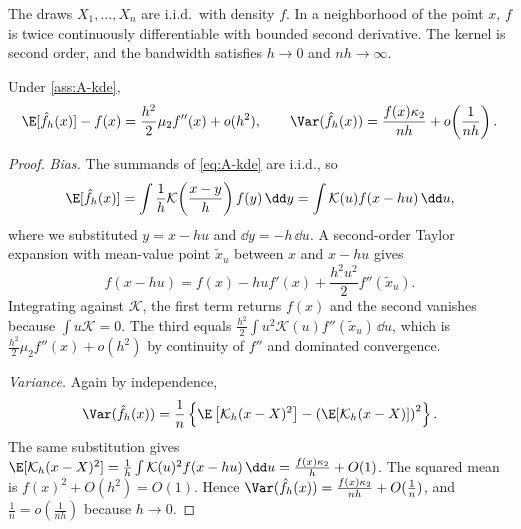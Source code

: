 \begin{assumption}\label{ass:A-kde}
The draws $X_1,\dots,X_n$ are i.i.d.\ with density $f$. In a neighborhood of the point $x$, $f$ is twice
continuously differentiable with bounded second derivative. The kernel is second order, and the bandwidth
satisfies $h\to0$ and $nh\to\infty$.
\end{assumption}

\begin{proposition}\label{prop:A-kde-bias-var}
Under \cref{ass:A-kde},
\begin{equation}\label{eq:A-kde-bias-var}
\E[\hat f_h(x)]-f(x)=\frac{h^2}{2}\mu_2f''(x)+o(h^2),\qquad
\Var(\hat f_h(x))=\frac{f(x)\kappa_2}{nh}+o\!\left(\frac{1}{nh}\right).
\end{equation}
\end{proposition}

\begin{proof}
\emph{Bias.} The summands of \eqref{eq:A-kde} are i.i.d., so
\begin{equation*}
\E[\hat f_h(x)]=\int\frac{1}{h}\mathcal{K}\!\left(\frac{x-y}{h}\right)f(y)\,\dd y
=\int\mathcal{K}(u)f(x-hu)\,\dd u ,
\end{equation*}
where we substituted $y=x-hu$ and $\dd y=-h\,\dd u$. A second-order Taylor expansion with mean-value
point $\tilde x_u$ between $x$ and $x-hu$ gives
\begin{equation*}
f(x-hu)=f(x)-huf'(x)+\frac{h^2u^2}{2}f''(\tilde x_u).
\end{equation*}
Integrating against $\mathcal{K}$, the first term returns $f(x)$ and the second vanishes because
$\int u\mathcal{K}=0$. The third equals $\frac{h^2}{2}\int u^2\mathcal{K}(u)f''(\tilde x_u)\,\dd u$, which
is $\frac{h^2}{2}\mu_2f''(x)+o(h^2)$ by continuity of $f''$ and dominated convergence.

\emph{Variance.} Again by independence,
\begin{equation*}
\Var(\hat f_h(x))=\frac{1}{n}\left\{\E\left[\mathcal{K}_h(x-X)^2\right]-\left(\E[\mathcal{K}_h(x-X)]\right)^2\right\}.
\end{equation*}
The same substitution gives
$\E[\mathcal{K}_h(x-X)^2]=\frac{1}{h}\int\mathcal{K}(u)^2f(x-hu)\,\dd u=\frac{f(x)\kappa_2}{h}+O(1)$.
The squared mean is $f(x)^2+O(h^2)=O(1)$. Hence
$\Var(\hat f_h(x))=\frac{f(x)\kappa_2}{nh}+O(\frac{1}{n})$, and $\frac{1}{n}=o(\frac{1}{nh})$ because
$h\to0$.
\end{proof}

